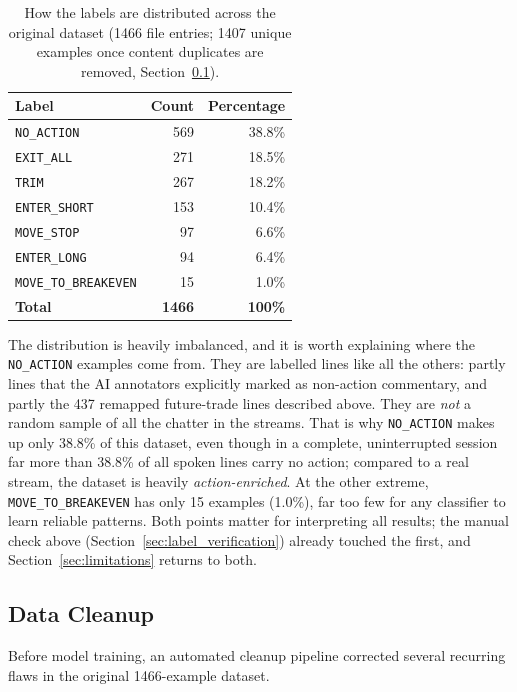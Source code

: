 \begin{table}[H]
\centering
\caption{How the labels are distributed across the original dataset (1466 file entries; 1407 unique examples once content duplicates are removed, Section~\ref{sec:data_cleanup}).}
\label{tab:label_distribution}
\begin{tabular}{@{}lrr@{}}
\toprule
\textbf{Label} & \textbf{Count} & \textbf{Percentage} \\
\midrule
\texttt{NO\_ACTION}          & 569 & 38.8\% \\
\texttt{EXIT\_ALL}           & 271 & 18.5\% \\
\texttt{TRIM}                & 267 & 18.2\% \\
\texttt{ENTER\_SHORT}        & 153 & 10.4\% \\
\texttt{MOVE\_STOP}          &  97 &  6.6\% \\
\texttt{ENTER\_LONG}         &  94 &  6.4\% \\
\texttt{MOVE\_TO\_BREAKEVEN} &  15 &  1.0\% \\
\midrule
\textbf{Total}               & \textbf{1466} & \textbf{100\%} \\
\bottomrule
\end{tabular}
\end{table}

The distribution is heavily imbalanced, and it is worth explaining where the \texttt{NO\_ACTION} examples come from. They are labelled lines like all the others: partly lines that the AI annotators explicitly marked as non-action commentary, and partly the 437 remapped future-trade lines described above. They are \emph{not} a random sample of all the chatter in the streams. That is why \texttt{NO\_ACTION} makes up only 38.8\% of this dataset, even though in a complete, uninterrupted session far more than 38.8\% of all spoken lines carry no action; compared to a real stream, the dataset is heavily \emph{action-enriched}. At the other extreme, \texttt{MOVE\_TO\_BREAKEVEN} has only 15 examples (1.0\%), far too few for any classifier to learn reliable patterns. Both points matter for interpreting all results; the manual check above (Section~\ref{sec:label_verification}) already touched the first, and Section~\ref{sec:limitations} returns to both.

\subsection{Data Cleanup}
\label{sec:data_cleanup}

Before model training, an automated cleanup pipeline corrected several recurring flaws in the original 1466-example dataset.

